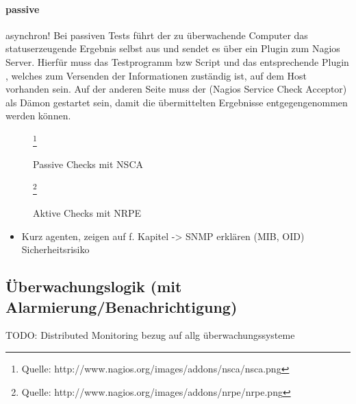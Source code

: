 \paragraph{passive}
asynchron!
Bei passiven Tests führt der zu überwachende Computer das statuserzeugende Ergebnis selbst aus und sendet es über ein Plugin zum Nagios Server.
Hierfür muss das Testprogramm bzw Script und das entsprechende Plugin , welches zum Versenden der Informationen zuständig ist, auf dem Host vorhanden sein.
Auf der anderen Seite muss der  (Nagios Service Check Acceptor) als Dämon gestartet sein, damit die übermittelten Ergebnisse entgegengenommen werden können.
\begin{figure}[ht]
	\centering
		\caption{Passive Checks mit NSCA}\footnote{Quelle: http://www.nagios.org/images/addons/nsca/nsca.png}
		\label{passivchecks}
\end{figure}


\begin{figure}[ht]
	\centering
		\caption{Aktive Checks mit NRPE}\footnote{Quelle: http://www.nagios.org/images/addons/nrpe/nrpe.png}
		\label{aktivchecks}
\end{figure}
\begin{itemize}
\item Kurz agenten, zeigen auf f. Kapitel -> SNMP erklären (MIB, OID) Sicherheitsrisiko
\end{itemize}

\subsection{Überwachungslogik (mit Alarmierung/Benachrichtigung)}
\label{dismoni}
\begin{center}
TODO: Distributed Monitoring bezug auf allg überwachungssysteme
\end{center}
